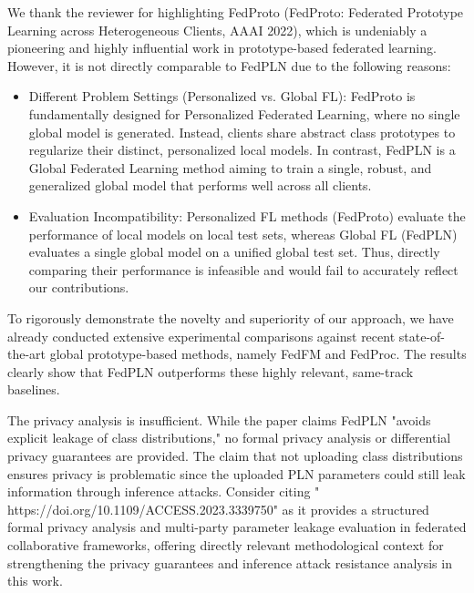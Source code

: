 \documentclass[a4paper,12pt]{article}
\begin{document}
We thank the reviewer for highlighting FedProto (FedProto: Federated Prototype Learning across Heterogeneous Clients, AAAI 2022), which is undeniably a pioneering and highly influential work in prototype-based federated learning.
However, it is not directly comparable to FedPLN due to the following reasons:
\begin{itemize}
    \item Different Problem Settings (Personalized vs. Global FL): FedProto is fundamentally designed for Personalized Federated Learning, where no single global model is generated.
    Instead, clients share abstract class prototypes to regularize their distinct, personalized local models.
    In contrast, FedPLN is a Global Federated Learning method aiming to train a single, robust, and generalized global model that performs well across all clients.
    \item Evaluation Incompatibility: Personalized FL methods (FedProto) evaluate the performance of local models on local test sets, whereas Global FL (FedPLN) evaluates a single global model on a unified global test set.
    Thus, directly comparing their performance is infeasible and would fail to accurately reflect our contributions.
\end{itemize}

To rigorously demonstrate the novelty and superiority of our approach, we have already conducted extensive experimental comparisons against recent state-of-the-art global prototype-based methods, namely FedFM and FedProc.
The results clearly show that FedPLN outperforms these highly relevant, same-track baselines.

\begin{tcolorbox}[title = {Comment 4},fonttitle = \bfseries]
	The privacy analysis is insufficient. While the paper claims FedPLN "avoids explicit leakage of class distributions," no formal privacy analysis or differential privacy guarantees are provided. The claim that not uploading class distributions ensures privacy is problematic since the uploaded PLN parameters could still leak information through inference attacks. Consider citing " https://doi.org/10.1109/ACCESS.2023.3339750" as it provides a structured formal privacy analysis and multi-party parameter leakage evaluation in federated collaborative frameworks, offering directly relevant methodological context for strengthening the privacy guarantees and inference attack resistance analysis in this work.
\end{tcolorbox}
\end{document}
